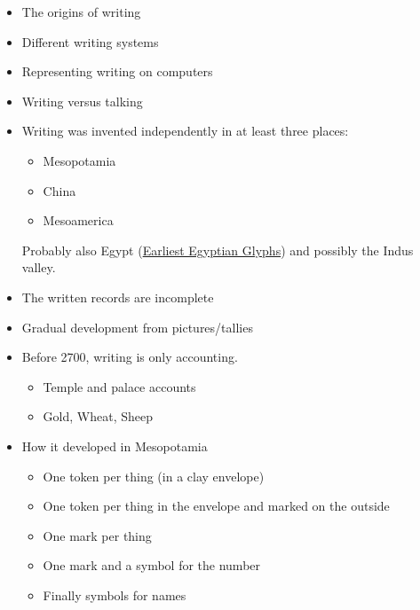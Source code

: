 \documentclass[a4paper,landscape,headrule,footrule,xetex]{foils}
\begin{document}


\maketitle


\begin{itemize}
\item The origins of writing %
\item Different writing systems
\item Representing writing on computers
\item Writing versus talking
\end{itemize}

\begin{itemize}
\item Writing was invented independently in at least three places:
  \begin{itemize}
  \item Mesopotamia
  \item China
  \item Mesoamerica
  \end{itemize}
  Probably also Egypt
  (\href{https://archive.archaeology.org/9903/newsbriefs/egypt.html}{Earliest
  Egyptian Glyphs}) and possibly the Indus valley.
\item The written records are incomplete
\item Gradual development from pictures/tallies
\end{itemize}


\begin{itemize}
\item Before 2700, writing is only accounting.
  \begin{itemize}
  \item Temple and palace accounts
  \item Gold, Wheat, Sheep
  \end{itemize}
\item How it developed in Mesopotamia
  \begin{itemize}
  \item One token per thing (in a clay envelope)
  \item One token per thing in the envelope and marked on the outside
  \item One mark per thing
  \item One mark and a symbol for the number
  \item Finally symbols for names
  \end{itemize}
\end{itemize}
\end{document}
